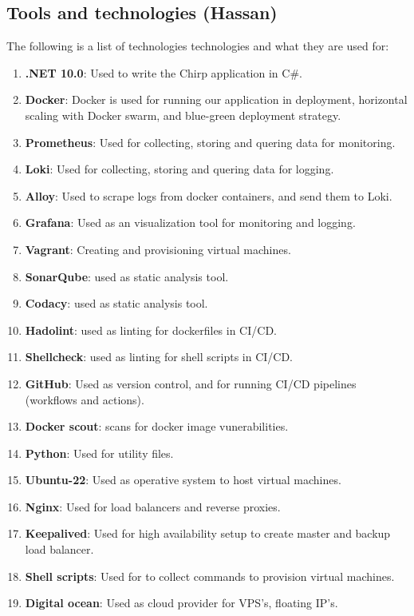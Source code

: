 \documentclass{article}
\begin{document}
\subsection{Tools and technologies (Hassan)}
The following is a list of technologies technologies and what they are used for:
\begin{enumerate}
    \item \textbf{.NET 10.0}: Used to write the Chirp application in C\#.
    \item \textbf{Docker}: Docker is used for running our application in deployment, horizontal scaling with Docker swarm, and blue-green deployment strategy.
    \item \textbf{Prometheus}: Used for collecting, storing and quering data for monitoring.
    \item \textbf{Loki}: Used for collecting, storing and quering data for logging.
    \item \textbf{Alloy}: Used to scrape logs from docker containers, and send them to Loki.
    \item \textbf{Grafana}: Used as an visualization tool for monitoring and logging.
    \item \textbf{Vagrant}: Creating and provisioning virtual machines.
    \item \textbf{SonarQube}: used as static analysis tool.
    \item \textbf{Codacy}: used as static analysis tool.
    \item \textbf{Hadolint}: used as linting for dockerfiles in CI/CD.
    \item \textbf{Shellcheck}: used as linting for shell scripts in CI/CD.
    \item \textbf{GitHub}: Used as version control, and for running CI/CD pipelines (workflows and actions).
    \item \textbf{Docker scout}: scans for docker image vunerabilities.
    \item \textbf{Python}: Used for utility files.
    \item \textbf{Ubuntu-22}: Used as operative system to host virtual machines.
    \item \textbf{Nginx}: Used for load balancers and reverse proxies.
    \item \textbf{Keepalived}: Used for high availability setup to create master and backup load balancer.
    \item \textbf{Shell scripts}: Used for to collect commands to provision virtual machines.
    \item \textbf{Digital ocean}: Used as cloud provider for VPS's, floating IP's.
    
\end{enumerate}
\end{document}
